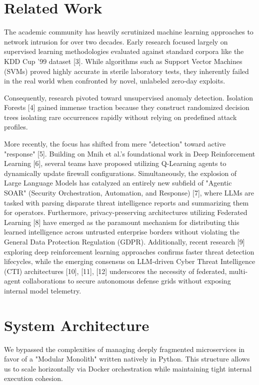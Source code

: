 \documentclass[conference]{IEEEtran}
\begin{document}
\section{Related Work}

The academic community has heavily scrutinized machine learning approaches to network intrusion for over two decades. Early research focused largely on supervised learning methodologies evaluated against standard corpora like the KDD Cup '99 dataset [3]. While algorithms such as Support Vector Machines (SVMs) proved highly accurate in sterile laboratory tests, they inherently failed in the real world when confronted by novel, unlabeled zero-day exploits.

Consequently, research pivoted toward unsupervised anomaly detection. Isolation Forests [4] gained immense traction because they construct randomized decision trees isolating rare occurrences rapidly without relying on predefined attack profiles. 

More recently, the focus has shifted from mere "detection" toward active "response" [5]. Building on Mnih et al.'s foundational work in Deep Reinforcement Learning [6], several teams have proposed utilizing Q-Learning agents to dynamically update firewall configurations. Simultaneously, the explosion of Large Language Models has catalyzed an entirely new subfield of "Agentic SOAR" (Security Orchestration, Automation, and Response) [7], where LLMs are tasked with parsing disparate threat intelligence reports and summarizing them for operators. Furthermore, privacy-preserving architectures utilizing Federated Learning [8] have emerged as the paramount mechanism for distributing this learned intelligence across untrusted enterprise borders without violating the General Data Protection Regulation (GDPR). Additionally, recent research [9] exploring deep reinforcement learning approaches confirms faster threat detection lifecycles, while the emerging consensus on LLM-driven Cyber Threat Intelligence (CTI) architectures [10], [11], [12] underscores the necessity of federated, multi-agent collaborations to secure autonomous defense grids without exposing internal model telemetry.

\section{System Architecture}

We bypassed the complexities of managing deeply fragmented microservices in favor of a "Modular Monolith" written natively in Python. This structure allows us to scale horizontally via Docker orchestration while maintaining tight internal execution cohesion.
\end{document}
